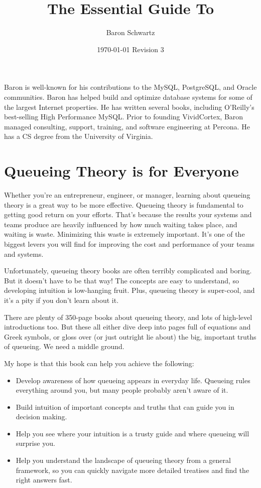 \documentclass{vivid_layout}
\title{The Essential Guide To}{Queueing Theory}
\date{\today{} \textbullet{} Revision 3}
\author{Baron Schwartz}{img/baron}
\begin{document}
\maketitle		%
\begin{bio}		%
Baron is well-known for his contributions to the MySQL, PostgreSQL, and Oracle communities. Baron has helped build and optimize database systems for some of the largest Internet properties. He has written several books, including O'Reilly's best-selling High Performance MySQL. Prior to founding VividCortex, Baron managed consulting, support, training, and software engineering at Percona. He has a CS degree from the University of Virginia.
\end{bio}
\tableofcontents	%

\section{Queueing Theory is for Everyone}

Whether you're an entrepreneur, engineer, or manager, learning about queueing theory is a great way to be more effective. Queueing theory is fundamental to getting good return on your efforts. That's because the results your systems and teams produce are heavily influenced by how much waiting takes place, and waiting is waste. Minimizing this waste is extremely important. It's one of the biggest levers you will find for improving the cost and performance of your teams and systems.

Unfortunately, queueing theory books are often terribly complicated and boring. But it doesn't have to be that way! The concepts are easy to understand, so developing intuition is low-hanging fruit. Plus, queueing theory is super-cool, and it's a pity if you don't learn about it.

There are plenty of 350-page books about queueing theory, and lots of high-level introductions too. But these all either dive deep into pages full of equations and Greek symbols, or gloss over (or just outright lie about) the big, important truths of queueing. We need a middle ground.

My hope is that this book can help you achieve the following:

\begin{itemize}
\item Develop awareness of how queueing appears in everyday life. Queueing rules everything around you, but many people probably aren't aware of it.
\item Build intuition of important concepts and truths that can guide you in decision making.
\item Help you see where your intuition is a trusty guide and where queueing will surprise you.
\item Help you understand the landscape of queueing theory from a general framework, so you can quickly navigate more detailed treatises and find the right answers fast.
\end{itemize}
\end{document}
